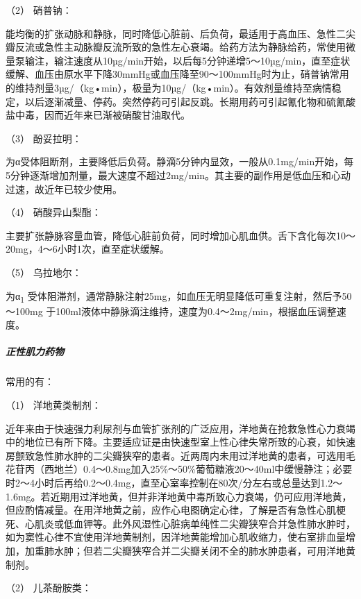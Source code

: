 \hypertarget{text00070.htmlux5cux23CHP3-2-4-3-4-2}{}
（2） 硝普钠：

能均衡的扩张动脉和静脉，同时降低心脏前、后负荷，最适用于高血压、急性二尖瓣反流或急性主动脉瓣反流所致的急性左心衰竭。给药方法为静脉给药，常使用微量泵输注，输注速度从10µg/min开始，以后每5分钟递增5～10µg/min，直至症状缓解、血压由原水平下降30mmHg或血压降至90～100mmHg时为止，硝普钠常用的维持剂量3µg/（kg•min），极量为10µg/（kg•min）。有效剂量维持至病情稳定，以后逐渐减量、停药。突然停药可引起反跳。长期用药可引起氰化物和硫氰酸盐中毒，因而近年来已渐被硝酸甘油取代。

\hypertarget{text00070.htmlux5cux23CHP3-2-4-3-4-3}{}
（3） 酚妥拉明：

为α受体阻断剂，主要降低后负荷。静滴5分钟内显效，一般从0.1mg/min开始，每5分钟逐渐增加剂量，最大速度不超过2mg/min。其主要的副作用是低血压和心动过速，故近年已较少使用。

\hypertarget{text00070.htmlux5cux23CHP3-2-4-3-4-4}{}
（4） 硝酸异山梨酯：

主要扩张静脉容量血管，降低心脏前负荷，同时增加心肌血供。舌下含化每次10～20mg，4～6小时1次，直至症状缓解。

\hypertarget{text00070.htmlux5cux23CHP3-2-4-3-4-5}{}
（5） 乌拉地尔：

为α\textsubscript{1}
受体阻滞剂，通常静脉注射25mg，如血压无明显降低可重复注射，然后予50～100mg
于100ml液体中静脉滴注维持，速度为0.4～2mg/min，根据血压调整速度。

\subparagraph{正性肌力药物}

常用的有：

\hypertarget{text00070.htmlux5cux23CHP3-2-4-3-5-1}{}
（1） 洋地黄类制剂：

近年来由于快速强力利尿剂与血管扩张剂的广泛应用，洋地黄在抢救急性心力衰竭中的地位已有所下降。主要适应证是由快速型室上性心律失常所致的心衰，如快速房颤致急性肺水肿的二尖瓣狭窄的患者。近两周内未用过洋地黄的患者，可选用毛花苷丙（西地兰）0.4～0.8mg加入25\%～50\%葡萄糖液20～40ml中缓慢静注；必要时2～4小时后再给0.2～0.4mg，直至心室率控制在80次/分左右或总量达到1.2～1.6mg。若近期用过洋地黄，但并非洋地黄中毒所致心力衰竭，仍可应用洋地黄，但应酌情减量。在用洋地黄之前，应作心电图确定心律，了解是否有急性心肌梗死、心肌炎或低血钾等。此外风湿性心脏病单纯性二尖瓣狭窄合并急性肺水肿时，如为窦性心律不宜使用洋地黄制剂，因洋地黄能增加心肌收缩力，使右室排血量增加，加重肺水肿；但若二尖瓣狭窄合并二尖瓣关闭不全的肺水肿患者，可用洋地黄制剂。

\hypertarget{text00070.htmlux5cux23CHP3-2-4-3-5-2}{}
（2） 儿茶酚胺类：

